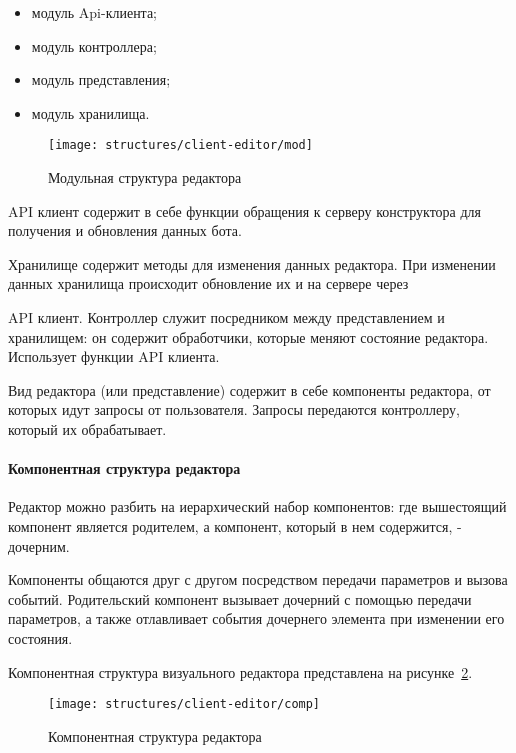 \begin{itemize}
	\item модуль Api-клиента;
	\item модуль контроллера;
	\item модуль представления;
	\item модуль хранилища.
\end{itemize}

\begin{figure}[ht]
	\centering
	\vspace{\toppaddingoffigure}
	\texttt{[image: structures/client-editor/mod]}
	\caption{Модульная структура редактора}
	\label{f:mod-client-editor-struct}
\end{figure}


API клиент содержит в себе функции обращения к серверу конструктора
для получения и обновления данных бота.

Хранилище содержит методы для изменения данных редактора. При
изменении данных хранилища происходит обновление их и на сервере через

API клиент.
Контроллер служит посредником между представлением и хранилищем:
он содержит обработчики, которые меняют состояние редактора. Использует
функции API клиента.

Вид редактора (или представление) содержит в себе компоненты
редактора, от которых идут запросы от пользователя. Запросы передаются
контроллеру, который их обрабатывает.


\paragraph{Компонентная структура редактора}

Редактор можно разбить на иерархический набор компонентов: где
вышестоящий компонент является родителем, а компонент, который в нем
содержится, - дочерним.

Компоненты общаются друг с другом посредством передачи параметров
и вызова событий. Родительский компонент вызывает дочерний с помощью
передачи параметров, а также отлавливает события дочернего элемента при
изменении его состояния.

Компонентная структура визуального редактора представлена на
рисунке~\ref{f:comp-client-editor-struct}.

\begin{figure}[ht]
	\centering
	\vspace{\toppaddingoffigure}
	\texttt{[image: structures/client-editor/comp]}
	\caption{Компонентная структура редактора}
	\label{f:comp-client-editor-struct}
\end{figure}

